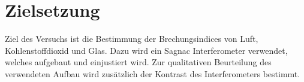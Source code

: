 \section{Zielsetzung}
\label{sec:zielsetzung}
Ziel des Versuchs ist die Bestimmung der Brechungsindices von Luft,
Kohlenstoffdioxid und Glas. Dazu wird ein Sagnac Interferometer verwendet,
welches aufgebaut und einjustiert wird. Zur qualitativen Beurteilung des
verwendeten Aufbau wird zusätzlich der Kontrast des Interferometers bestimmt.
